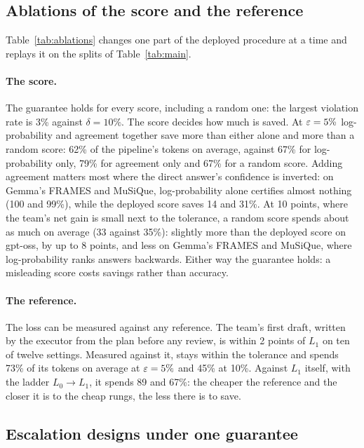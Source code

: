 \subsection{Ablations of the score and the reference}
\label{app:ablations}



Table~\ref{tab:ablations} changes one part of the deployed procedure at a time and replays it on the splits of
Table~\ref{tab:main}.

\paragraph{The score.} The guarantee holds for every score, including a random one: the largest violation rate is
3\% against $\delta = 10\%$. The score decides how much is saved. At $\varepsilon = 5\%$ log-probability and agreement
together save more than either alone and more than a random score: 62\% of the pipeline's tokens on average,
against 67\% for log-probability only, 79\% for agreement only and 67\% for a random score. Adding agreement matters
most where the direct answer's confidence is inverted: on Gemma's FRAMES and MuSiQue, log-probability alone
certifies almost nothing (100 and 99\%), while the deployed score saves 14 and 31\%. At 10 points, where the
team's net gain is small next to the tolerance, a random score spends about as much on average (33 against 35\%):
slightly more than the deployed score on gpt-oss, by up to 8 points, and less on Gemma's FRAMES and MuSiQue, where
log-probability ranks answers backwards. Either way the guarantee holds: a misleading score costs savings rather than accuracy.

\paragraph{The reference.} The loss can be measured against any reference. The team's first draft, written by the
executor from the plan before any review, is within 2 points of $L_1$ on ten of twelve settings. Measured
against it, \climb{} stays within the tolerance and spends 73\% of its tokens on average at $\varepsilon = 5\%$ and
45\% at 10\%. Against $L_1$ itself, with the ladder $L_0 \to L_1$, it spends 89 and 67\%: the cheaper the
reference and the closer it is to the cheap rungs, the less there is to save.

\subsection{Escalation designs under one guarantee}
\label{sec:variants}

